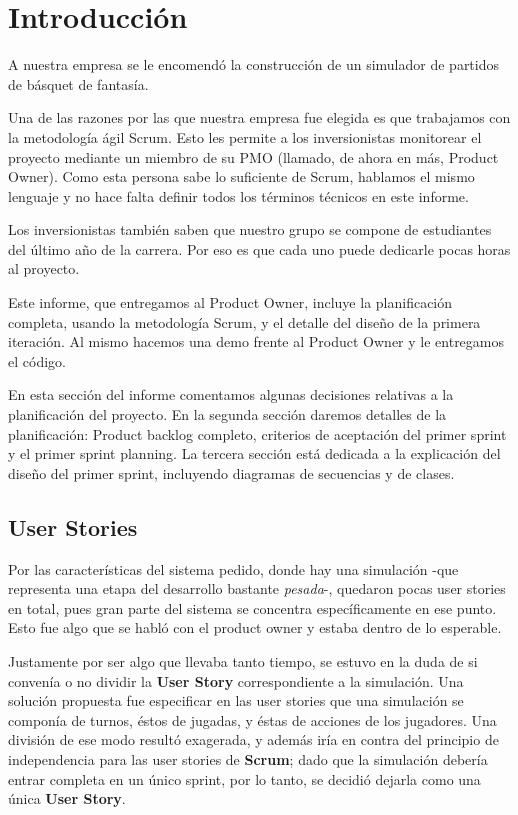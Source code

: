\section{Introducción}
\indent \indent A nuestra empresa se le encomendó la construcción de un simulador de partidos de básquet de fantasía.

Una de las razones por las que nuestra empresa fue elegida es que trabajamos con la metodología ágil Scrum. Esto les permite a los inversionistas monitorear el proyecto mediante un miembro de su PMO (llamado, de ahora en más, Product Owner). Como esta persona sabe lo suficiente de Scrum, hablamos el mismo lenguaje y no hace falta definir todos los términos técnicos en este informe.

Los inversionistas también saben que nuestro grupo se compone de estudiantes del último año de la carrera. Por eso es que cada uno puede dedicarle pocas horas al proyecto.

Este informe, que entregamos al Product Owner, incluye la planificación completa, usando la metodología Scrum, y el detalle del diseño de la primera iteración. Al mismo hacemos una demo frente al Product Owner y le entregamos el código.

En esta sección del informe comentamos algunas decisiones relativas a la planificación del proyecto. En la segunda sección daremos detalles de la planificación: Product backlog completo, criterios de aceptación del primer sprint y el primer sprint planning. La tercera sección está dedicada a la explicación del diseño del primer sprint, incluyendo diagramas de secuencias y de clases.

\subsection*{User Stories}
Por las características del sistema pedido, donde hay una simulación -que representa una etapa del desarrollo bastante \emph{pesada}-, quedaron pocas user stories en total, pues gran parte del sistema se concentra específicamente en ese punto. Esto fue algo que se habló con el product owner y estaba dentro de lo esperable.

Justamente por ser algo que llevaba tanto tiempo, se estuvo en la duda de si convenía o no dividir la \textbf{User Story} correspondiente a la simulación. Una solución propuesta fue especificar en las user stories que una simulación se componía de turnos, éstos de jugadas, y éstas de acciones de los jugadores. Una división de ese modo resultó exagerada, y además iría en contra del principio de independencia para las user stories de \textbf{Scrum}; dado que la simulación debería entrar completa en un único sprint, por lo tanto, se decidió dejarla como una única \textbf{User Story}.

